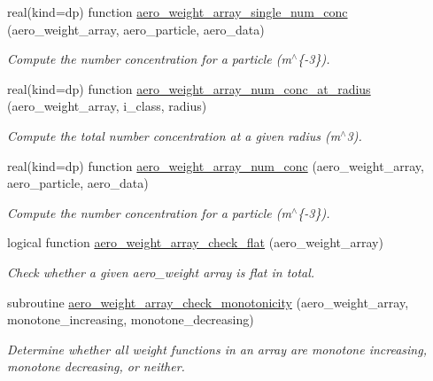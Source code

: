\begin{DoxyCompactItemize}
real(kind=dp) function \mbox{\hyperlink{namespacepmc__aero__weight__array_adb38b8169574f5d8e3fa131ccdf1dcb4}{aero\+\_\+weight\+\_\+array\+\_\+single\+\_\+num\+\_\+conc}} (aero\+\_\+weight\+\_\+array, aero\+\_\+particle, aero\+\_\+data)
\begin{DoxyCompactList}\small\item\em Compute the number concentration for a particle (m$^\wedge$\{-\/3\}). \end{DoxyCompactList}\item 
real(kind=dp) function \mbox{\hyperlink{namespacepmc__aero__weight__array_a8a39b084f2952ba5f1068eadac2c48ed}{aero\+\_\+weight\+\_\+array\+\_\+num\+\_\+conc\+\_\+at\+\_\+radius}} (aero\+\_\+weight\+\_\+array, i\+\_\+class, radius)
\begin{DoxyCompactList}\small\item\em Compute the total number concentration at a given radius (m$^\wedge$3). \end{DoxyCompactList}\item 
real(kind=dp) function \mbox{\hyperlink{namespacepmc__aero__weight__array_a58a8646015dbbed5447fe415353b8e29}{aero\+\_\+weight\+\_\+array\+\_\+num\+\_\+conc}} (aero\+\_\+weight\+\_\+array, aero\+\_\+particle, aero\+\_\+data)
\begin{DoxyCompactList}\small\item\em Compute the number concentration for a particle (m$^\wedge$\{-\/3\}). \end{DoxyCompactList}\item 
logical function \mbox{\hyperlink{namespacepmc__aero__weight__array_ad145b87a8e1a71fda62dadb01b4cff39}{aero\+\_\+weight\+\_\+array\+\_\+check\+\_\+flat}} (aero\+\_\+weight\+\_\+array)
\begin{DoxyCompactList}\small\item\em Check whether a given aero\+\_\+weight array is flat in total. \end{DoxyCompactList}\item 
subroutine \mbox{\hyperlink{namespacepmc__aero__weight__array_aad4535065f56a39ce8da5717f0c334fd}{aero\+\_\+weight\+\_\+array\+\_\+check\+\_\+monotonicity}} (aero\+\_\+weight\+\_\+array, monotone\+\_\+increasing, monotone\+\_\+decreasing)
\begin{DoxyCompactList}\small\item\em Determine whether all weight functions in an array are monotone increasing, monotone decreasing, or neither. \end{DoxyCompactList}\item 

\end{DoxyCompactItemize}
